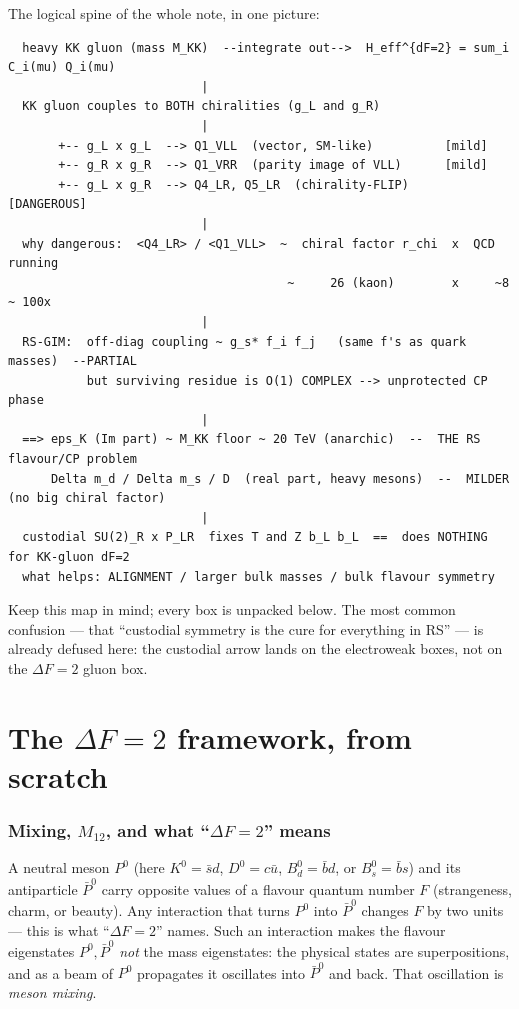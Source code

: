 \documentclass[11pt]{article}
\theoremstyle{definition}
\begin{document}
\noindent The logical spine of the whole note, in one picture:
\begin{footnotesize}
\begin{verbatim}
  heavy KK gluon (mass M_KK)  --integrate out-->  H_eff^{dF=2} = sum_i C_i(mu) Q_i(mu)
                           |
  KK gluon couples to BOTH chiralities (g_L and g_R)
                           |
       +-- g_L x g_L  --> Q1_VLL  (vector, SM-like)          [mild]
       +-- g_R x g_R  --> Q1_VRR  (parity image of VLL)      [mild]
       +-- g_L x g_R  --> Q4_LR, Q5_LR  (chirality-FLIP)     [DANGEROUS]
                           |
  why dangerous:  <Q4_LR> / <Q1_VLL>  ~  chiral factor r_chi  x  QCD running
                                       ~     26 (kaon)        x     ~8        ~ 100x
                           |
  RS-GIM:  off-diag coupling ~ g_s* f_i f_j   (same f's as quark masses)  --PARTIAL
           but surviving residue is O(1) COMPLEX --> unprotected CP phase
                           |
  ==> eps_K (Im part) ~ M_KK floor ~ 20 TeV (anarchic)  --  THE RS flavour/CP problem
      Delta m_d / Delta m_s / D  (real part, heavy mesons)  --  MILDER (no big chiral factor)
                           |
  custodial SU(2)_R x P_LR  fixes T and Z b_L b_L  ==  does NOTHING for KK-gluon dF=2
  what helps: ALIGNMENT / larger bulk masses / bulk flavour symmetry
\end{verbatim}
\end{footnotesize}
\noindent Keep this map in mind; every box is unpacked below. The most common
confusion --- that ``custodial symmetry is the cure for everything in RS'' --- is
already defused here: the custodial arrow lands on the electroweak boxes, not on
the $\Delta F=2$ gluon box.

\part{The $\Delta F=2$ framework, from scratch}
\label{part:framework}

\section{Mixing, $M_{12}$, and what ``$\Delta F=2$'' means}
\label{sec:mixing}

A neutral meson $P^0$ (here $K^0=\bar s d$, $D^0=c\bar u$, $B_d^0=\bar b d$, or
$B_s^0=\bar b s$) and its antiparticle $\bar P^0$ carry opposite values of a
flavour quantum number $F$ (strangeness, charm, or beauty). Any interaction that
turns $P^0$ into $\bar P^0$ changes $F$ by two units --- this is what
``\emph{$\Delta F=2$}'' names. Such an interaction makes the flavour eigenstates
$P^0,\bar P^0$ \emph{not} the mass eigenstates: the physical states are
superpositions, and as a beam of $P^0$ propagates it oscillates into $\bar P^0$
and back. That oscillation is \emph{meson mixing}.
\end{document}
